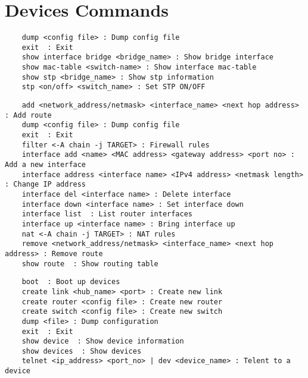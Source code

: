 \chapter{Devices Commands}
\label{ch:commands}
\lstset{language=TeX,caption=Switch commands ,label=lst:sw-commands}
\begin{lstlisting}
	dump <config file> : Dump config file
	exit  : Exit
	show interface bridge <bridge_name> : Show bridge interface
	show mac-table <switch-name> : Show interface mac-table
	show stp <bridge_name> : Show stp information
	stp <on/off> <switch_name> : Set STP ON/OFF
\end{lstlisting}

\lstset{language=TeX,caption=Router commands ,label=lst:sw-commands}
\begin{lstlisting}
	add <network_address/netmask> <interface_name> <next hop address> : Add route
	dump <config file> : Dump config file
	exit  : Exit
	filter <-A chain -j TARGET> : Firewall rules
	interface add <name> <MAC address> <gateway address> <port no> : Add a new interface
	interface address <interface name> <IPv4 address> <netmask length> : Change IP address
	interface del <interface name> : Delete interface
	interface down <interface name> : Set interface down
	interface list  : List router interfaces
	interface up <interface name> : Bring interface up
	nat <-A chain -j TARGET> : NAT rules
	remove <network_address/netmask> <interface_name> <next hop address> : Remove route
	show route  : Show routing table
\end{lstlisting}

\lstset{language=TeX,caption=CLI Hypervisor commands ,label=lst:sw-commands}
\begin{lstlisting}
	boot  : Boot up devices
	create link <hub_name> <port> : Create new link
	create router <config file> : Create new router
	create switch <config file> : Create new switch
	dump <file> : Dump configuration
	exit  : Exit
	show device  : Show device information
	show devices  : Show devices
	telnet <ip_address> <port_no> | dev <device_name> : Telent to a device
\end{lstlisting}
